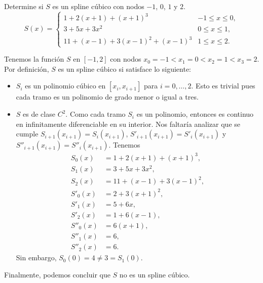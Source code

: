 \begin{statement}{1}
  Determine si $S$ es un spline c\'ubico con nodos $-1$, $0$, $1$ y $2$.
  \[
    S(x) = 
    \begin{cases}
      1 + 2(x + 1) + (x + 1)^3 & -1 \leq x \leq 0, \\
      3 + 5x + 3x^2 & 0 \leq x \leq 1, \\
      11 + (x - 1) + 3 (x - 1)^2 + (x - 1)^3 & 1 \leq x \leq 2.
    \end{cases}
  \]
\end{statement}

\begin{solution}
  Tenemos la funci\'on $S$ en $[-1, 2]$ con nodos
  $x_0 = -1 < x_1 = 0 < x_2 = 1 < x_3 = 2$.
  Por definici\'on, $S$ es un spline c\'ubico si satisface lo siguiente:
  \begin{itemize}
    \item $S_i$ es un polinomio c\'ubico en $[x_i, x_{i + 1}]$ para $i = 0, \dots, 2$.
    Esto es trivial pues cada tramo es un polinomio de grado menor o igual a tres.
    \item $S$ es de clase $C^2$. Como cada tramo $S_i$ es un polinomio, entonces
    es continuo en infinitamente diferenciable en su interior.
    Nos faltar\'ia analizar que se cumple
    $S_{i + 1}(x_{i + 1}) = S_i(x_{i + 1})$,
    $S'_{i + 1}(x_{i + 1}) = S'_i(x_{i + 1})$ y
    $S''_{i + 1}(x_{i + 1}) = S''_i(x_{i + 1})$.
    Tenemos
    \begin{align*}
      S_0(x) &= 1 + 2(x + 1) + (x + 1)^3,\\
      S_1(x) &= 3 + 5x + 3x^2,\\
      S_2(x) &= 11 + (x - 1) + 3(x - 1)^2,\\
      S'_0(x) &= 2 + 3(x + 1)^2,\\
      S'_1(x) &= 5 + 6x,\\
      S'_2(x) &= 1 + 6(x - 1),\\
      S''_0(x) &= 6(x + 1),\\
      S''_1(x) &= 6,\\
      S''_2(x) &= 6.
    \end{align*}
    Sin embargo, $S_0(0) = 4 \neq 3 = S_1(0)$.
  \end{itemize}
  Finalmente, podemos concluir que $S$ no es un spline c\'ubico.
\end{solution}
